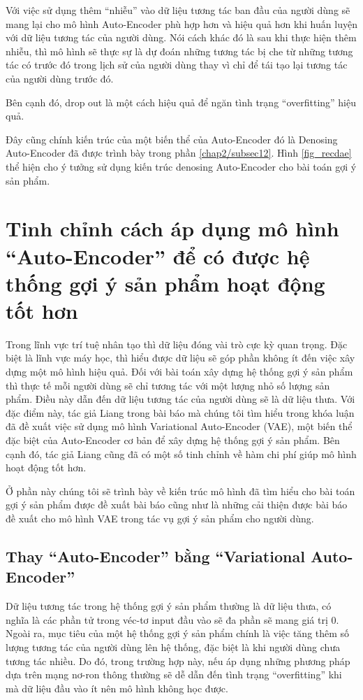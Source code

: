     Với việc sử dụng thêm ``nhiễu'' vào dữ liệu tương tác ban đầu của người dùng sẽ mang lại cho mô hình Auto-Encoder phù hợp hơn và hiệu quả hơn khi huấn luyện với dữ liệu tương tác của người dùng.
    Nói cách khác đó là sau khi thực hiện thêm nhiễu, thì mô hình sẽ thực sự là dự đoán những tương tác bị che từ những tương tác có trước đó trong lịch sử của người dùng thay vì chỉ để tái tạo lại tương tác của người dùng trước đó.

    Bên cạnh đó, drop out là một cách hiệu quả để ngăn tình trạng ``overfitting'' hiệu quả.

    Đây cũng chính kiến trúc của một biến thể của Auto-Encoder đó là Denosing Auto-Encoder đã được trình bày trong phần \ref{chap2/subsec12}.
    Hình \ref{fig_recdae} thể hiện cho ý tưởng sử dụng kiến trúc denosing Auto-Encoder cho bài toán gợi ý sản phẩm.     

    

\section{Tinh chỉnh cách áp dụng mô hình ``Auto-Encoder'' để có được hệ thống gợi ý sản phẩm hoạt động tốt hơn}
    Trong lĩnh vực trí tuệ nhân tạo thì dữ liệu đóng vài trò cực kỳ quan trọng.
    Đặc biệt là lĩnh vực máy học, thì hiểu được dữ liệu sẽ góp phần không ít đến việc xây dựng một mô hình hiệu quả. 
    Đối với bài toán xây dựng hệ thống gợi ý sản phẩm thì thực tế mỗi người dùng sẽ chỉ tương tác với một lượng nhỏ số lượng sản phẩm.
    Điều này dẫn đến dữ liệu tương tác của người dùng sẽ là dữ liệu thưa.
    Với đặc điểm này, tác giả Liang trong bài báo \cite{mvae} mà chúng tôi tìm hiểu trong khóa luận đã đề xuất việc sử dụng mô hình Variational Auto-Encoder (VAE), một biến thể đặc biệt của Auto-Encoder cơ bản để xây dựng hệ thống gợi ý sản phẩm. 
    Bên cạnh đó, tác giả Liang cũng đã có một số tinh chỉnh về hàm chi phí giúp mô hình hoạt động tốt hơn.

    Ở phần này chúng tôi sẽ trình bày về kiến trúc mô hình đã tìm hiểu cho bài toán gợi ý sản phẩm được đề xuất bài báo cũng như là những cải thiện được bài báo đề xuất cho mô hình VAE trong tác vụ gợi ý sản phẩm cho người dùng. 

    \subsection{Thay ``Auto-Encoder'' bằng ``Variational Auto-Encoder''}
    
    Dữ liệu tương tác trong hệ thống gợi ý sản phẩm thường là dữ liệu thưa, có nghĩa là các phần tử trong véc-tơ input đầu vào sẽ đa phần sẽ mang giá trị 0. 
    Ngoài ra, mục tiêu của một hệ thống gợi ý sản phẩm chính là việc tăng thêm số lượng tương tác của người dùng lên hệ thống, đặc biệt là khi người dùng chưa tương tác nhiều.
    Do đó, trong trường hợp này, nếu áp dụng những phương pháp dựa trên mạng nơ-ron thông thường sẽ dễ dẫn đến tình trạng ``overfitting'' khi mà dữ liệu đầu vào ít nên mô hình không học được.
    
